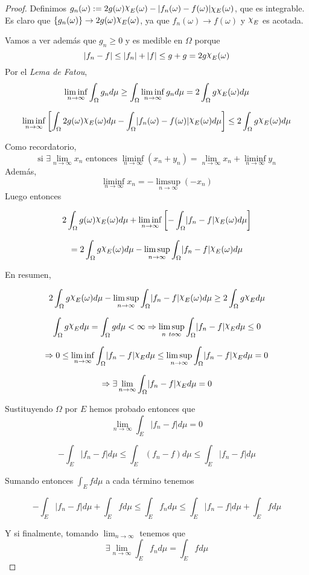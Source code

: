 \documentclass[11pt, a4paper]{article}
\providecommand{\abs}[1]{\lvert#1\rvert}
\DeclareRobustCommand{\rchi}{{\mathpalette\irchi\relax}}
\newcommand{\irchi}[2]{\raisebox{\depth}{$#1\chi$}} %
\theoremstyle{theorem-style}
\theoremstyle{definition-style}
\theoremstyle{remark-style}
\theoremstyle{example-style}
\begin{document}
\begin{proof}
  Definimos $g_n(\omega) := 2g(\omega)\rchi_E(\omega) - \abs{f_n(\omega) - f(\omega)} \chi_E (\omega)$, que es integrable. Es claro que $\{g_n(\omega)\} \rightarrow 2g(\omega)\rchi_E(\omega)$, ya que $f_n(\omega) \rightarrow f(\omega)$ y $\rchi_E$ es acotada.
  
  Vamos a ver además que $g_n \geq 0$ y es medible en $\Omega$ porque $$|f_n - f| \leq |f_n| + |f| \leq g + g = 2g\rchi_E(\omega)$$
  Por el \textit{Lema de Fatou}, 
  $$\liminf_{n \to \infty} \int_{\Omega} g_n d \mu \geq \int_{\Omega} \liminf_{n \to \infty} g_n d \mu = 2 \int_{\Omega} g\rchi_E(\omega)d\mu$$
  
  $$\liminf_{n \to \infty} \left[\int_{\Omega} 2g(\omega)\rchi_E(\omega) d\mu - \int_{\Omega} \abs{f_n(\omega) - f(\omega)}\rchi_E(\omega) d \mu \right] \leq 2\int_{\Omega} g\rchi_E(\omega) d \mu$$

  Como recordatorio, $$\text{si } \exists \lim_{n \to \infty} x_n \text{ entonces } \liminf_{n \to \infty} (x_n + y_n) = \lim_{n \to \infty} x_n + \liminf_{n \to \infty} y_n$$ Además, $$\liminf_{n \to \infty} x_n = - \limsup_{n \to \infty} (- x_n)$$
  Luego entonces
  
  $$2 \int_{\Omega} g(\omega)\rchi_E(\omega) d \mu + \liminf_{n \to \infty} \left[-\int_{\Omega} \abs{f_n - f} \rchi_E(\omega) d \mu \right]$$
  
  $$ = 2 \int_{\Omega} g \rchi_E(\omega) d \mu - \limsup_{n \to \infty} \int_{\Omega} \abs{f_n - f} \rchi_E(\omega) d \mu$$
  
  En resumen,
  
  $$2 \int_{\Omega} g \rchi_E(\omega) d \mu - \limsup_{n \to \infty} \int_{\Omega} \abs{f_n - f} \rchi_E(\omega) d \mu \geq 2 \int_{\Omega} g \rchi_{E} d \mu$$
  
  $$\int_{\Omega} g \rchi_{E} d \mu = \int_{\Omega} g  d \mu < \infty \Rightarrow \limsup_{n \ to \infty} \int_{\Omega} \abs{f_n - f} \rchi_E d \mu \leq 0$$
  
  $$\Rightarrow 0 \leq \liminf_{n \to \infty} \int_{\Omega} \abs{f_n - f} \rchi_E d \mu \leq \limsup_{n \to \infty} \int_{\Omega} \abs{f_n - f} \rchi_E d \mu = 0$$
  
  $$\Rightarrow \exists \lim_{n \to \infty} \int_{\Omega} \abs{f_n - f} \rchi_E d \mu = 0$$
  
  Sustituyendo $\Omega$  por $E$ hemos probado entonces que 
  $$\lim_{n \to \infty} \int_{E} \abs{f_n - f} d \mu = 0$$
  
  $$- \int_E \abs{f_n - f} d \mu \leq \int_E (f_n - f) d \mu \leq \int_E \abs{f_n - f} d \mu$$
  
  Sumando entonces $\displaystyle \int_E f d \mu$ a cada término tenemos
  
  $$ - \int_E \abs{f_n - f} d \mu + \int_E f d \mu \leq \int_E f_n d \mu \leq \int_E \abs{f_n - f} d \mu + \int_E f d \mu$$
  
  Y si finalmente, tomando $\lim_{n \to \infty}$ tenemos que
  $$ \exists \lim_{n \to \infty} \int_E f_n d \mu = \int_E f d \mu$$
\end{proof}
\end{document}
